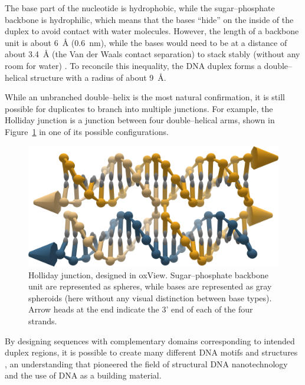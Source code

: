 The base part of the nucleotide is hydrophobic, while the sugar--phosphate backbone is hydrophilic, which means that the bases ``hide'' on the inside of the duplex to avoid contact with water molecules. However, the length of a backbone unit is about 6~Å (0.6~nm), while the bases would need to be at a distance of about 3.4~Å (the Van der Waals contact separation) to stack stably (without any room for water) \cite{calladine1997understanding}. To reconcile this inequality, the DNA duplex forms a double--helical structure with a radius of about 9~Å.

While an unbranched double--helix is the most natural confirmation, it is still possible for duplicates to branch into multiple junctions. For example, the Holliday junction is a junction between four double--helical arms, shown in Figure~\ref{fig:holliday} in one of its possible configurations.

\begin{figure}
    \centering\includegraphics[width=\textwidth]{figures/holliday.png}
    \caption{Holliday junction, designed in oxView. Sugar--phosphate backbone unit are represented as spheres, while bases are represented as gray spheroids (here without any visual distinction between base types). Arrow heads at the end indicate the 3' end of each of the four strands.}
    \label{fig:holliday}
\end{figure}



By designing sequences with complementary domains corresponding to intended duplex regions, it is possible to create many different DNA motifs and structures \cite{seeman_2016, Seeman1982}, an understanding that pioneered the field of structural DNA nanotechnology and the use of DNA as a building material.

